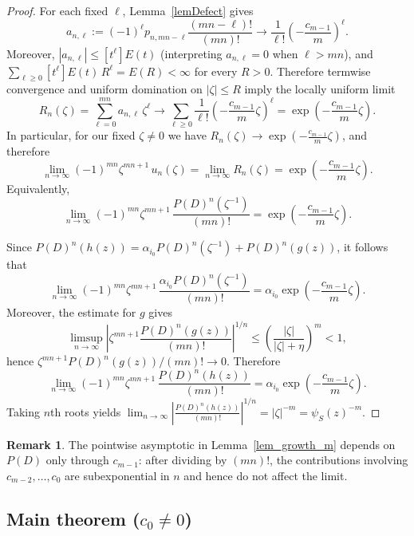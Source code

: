 \documentclass[12pt]{article}
\theoremstyle{plain}
\theoremstyle{definition}
\newtheorem{remark}[theorem]{Remark}
\begin{document}
\begin{proof}
For each fixed $\ell$, Lemma~\ref{lemDefect} gives
$$a_{n,\ell}:=(-1)^{\ell}p_{n,mn-\ell}\frac{(mn-\ell)!}{(mn)!}\longrightarrow
\frac{1}{\ell!}\left(-\frac{c_{m-1}}{m}\right)^{\ell}.$$
Moreover, $|a_{n,\ell}|\le [t^{\ell}]E(t)$ (interpreting $a_{n,\ell}=0$ when $\ell>mn$), and
$\sum_{\ell\ge0}[t^{\ell}]E(t)\,R^{\ell}=E(R)<\infty$ for every $R>0$.
Therefore termwise convergence and uniform domination on $|\zeta|\le R$ imply the locally uniform limit
$$R_n(\zeta)=\sum_{\ell=0}^{mn}a_{n,\ell}\,\zeta^{\ell}\longrightarrow
\sum_{\ell\ge0}\frac{1}{\ell!}\left(-\frac{c_{m-1}}{m}\zeta\right)^{\ell}
=\exp\!\left(-\frac{c_{m-1}}{m}\zeta\right).$$
In particular, for our fixed $\zeta\neq0$ we have $R_n(\zeta)\to\exp\!\left(-\frac{c_{m-1}}{m}\zeta\right)$, and therefore
$$\lim_{n\to\infty}(-1)^{mn}\zeta^{mn+1}\,u_n(\zeta)
=\lim_{n\to\infty}R_n(\zeta)=\exp\!\left(-\frac{c_{m-1}}{m}\zeta\right).$$
Equivalently,
$$\lim_{n\to\infty}(-1)^{mn}\zeta^{mn+1}\,\frac{P(D)^n(\zeta^{-1})}{(mn)!}
=\exp\!\left(-\frac{c_{m-1}}{m}\zeta\right).$$

Since $P(D)^n(h(z))=\alpha_{i_0}P(D)^n(\zeta^{-1})+P(D)^n(g(z))$, it follows that
$$\lim_{n\to\infty}(-1)^{mn}\zeta^{mn+1}\,\frac{\alpha_{i_0}P(D)^n(\zeta^{-1})}{(mn)!}
=\alpha_{i_0}\exp\!\left(-\frac{c_{m-1}}{m}\zeta\right).$$
Moreover, the estimate for $g$ gives
$$\limsup_{n\to\infty}\left|\zeta^{mn+1}\frac{P(D)^n(g(z))}{(mn)!}\right|^{1/n}
\le \left(\frac{|\zeta|}{|\zeta|+\eta}\right)^m<1,$$
hence $\zeta^{mn+1}P(D)^n(g(z))/(mn)!\to0$.
Therefore
$$\lim_{n\to\infty}(-1)^{mn}\zeta^{mn+1}\,\frac{P(D)^n(h(z))}{(mn)!}
=\alpha_{i_0}\exp\!\left(-\frac{c_{m-1}}{m}\zeta\right).$$
Taking $n$th roots yields $\lim_{n\to\infty}\left|\frac{P(D)^n(h(z))}{(mn)!}\right|^{1/n}=|\zeta|^{-m}=\psi_S(z)^{-m}$.
\end{proof}

\smallskip
\begin{remark}
The pointwise asymptotic in Lemma~\ref{lem_growth_m} depends on $P(D)$ only through $c_{m-1}$: after dividing by $(mn)!$, the contributions involving $c_{m-2},\dots,c_0$ are subexponential in $n$ and hence do not affect the limit.
\end{remark}

\subsection{Main theorem ($c_0\neq0$)}
\end{document}
